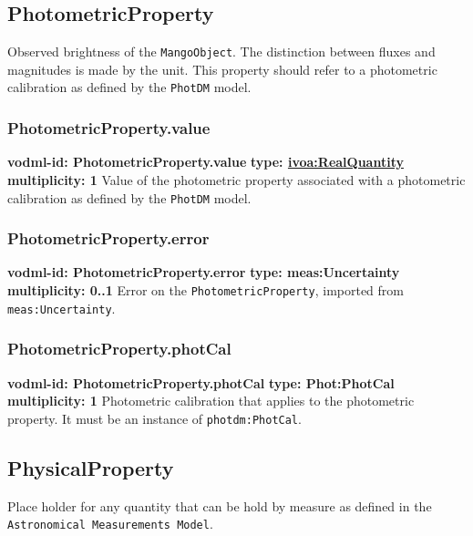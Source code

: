   \subsection{PhotometricProperty}
  \label{sect:PhotometricProperty}
    Observed brightness of the \texttt{MangoObject}. The distinction between fluxes and magnitudes is made by the unit. This property should refer to a photometric calibration as defined by the \texttt{PhotDM} model.

    \subsubsection{PhotometricProperty.value}
      \textbf{vodml-id: PhotometricProperty.value} \newline
      \textbf{type: \hyperref[sect:ivoa]{ivoa:RealQuantity}} \newline
      \textbf{multiplicity: 1} \newline 
      Value of the photometric property associated with a photometric calibration as defined by the \texttt{PhotDM} model.

    \subsubsection{PhotometricProperty.error}
      \textbf{vodml-id: PhotometricProperty.error} \newline
      \textbf{type: meas:Uncertainty} \newline
      \textbf{multiplicity: 0..1} \newline 
      Error on the \texttt{PhotometricProperty}, imported from \texttt{meas:Uncertainty}.

    \subsubsection{PhotometricProperty.photCal}
      \textbf{vodml-id: PhotometricProperty.photCal} \newline
      \textbf{type: Phot:PhotCal} \newline
      \textbf{multiplicity: 1} \newline 
      Photometric calibration that applies to the photometric property. It must be an instance of \texttt{photdm:PhotCal}.

  \subsection{PhysicalProperty}
  \label{sect:PhysicalProperty}
    Place holder for any quantity that can be hold by measure as defined in the \texttt{Astronomical Measurements Model}.

